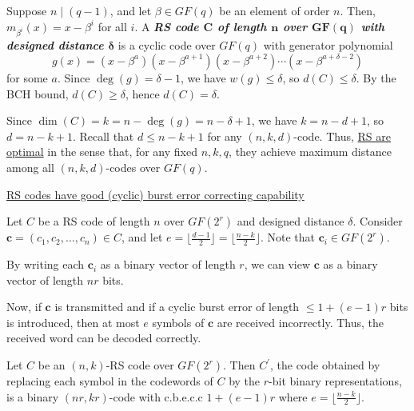 \begin{defbox}
    \begin{definition}
        Suppose $ n\mid (q-1) $, and let $ \beta\in GF(q) $ be an element of order $ n $.
        Then, $ m_{\beta^i}(x)=x-\beta^i $ for all $ i $. A
        \textbf{\emph{RS code $ \bm{C} $ of length $ \bm{n} $ over $ \bm{GF(q)} $
                with designed distance $ \bm{\delta} $}} is a cyclic code over $ GF(q) $
        with generator polynomial
        \[ g(x)=(x-\beta^{a})(x-\beta^{a+1})(x-\beta^{a+2})\cdots
            (x-\beta^{a+\delta-2}) \]
        for some $ a $. Since $ \deg(g)=\delta-1 $, we have $ w(g)\leqslant \delta $,
        so $ d(C)\leqslant \delta $. By the BCH bound, $ d(C)\geqslant \delta $,
        hence $ d(C)=\delta $.

        Since $ \dim(C)=k=n-\deg(g)=n-\delta+1 $, we have $ k=n-d+1 $,
        so $ d=n-k+1 $. Recall that $ d\leqslant n-k+1 $ for any $ (n,k,d) $-code.
        Thus, \underline{RS are optimal} in the sense that, for any fixed $ n,k,q $,
        they achieve maximum distance among all $ (n,k,d) $-codes over $ GF(q) $.
    \end{definition}
\end{defbox}

\underline{RS codes have good (cyclic) burst error correcting capability}

Let $ C $ be a RS code of length $ n $ over $ GF(2^r) $ and designed
distance $ \delta $. Consider $ \bm{c}=(c_1,c_2,\ldots ,c_n)\in C $,
and let $ e=\lfloor\frac{d-1}{2} \rfloor =\lfloor\frac{n-k}{2} \rfloor $.
Note that $ \bm{c}_i\in GF(2^r) $.

By writing each $ \bm{c}_i $ as a binary vector of length
$ r $, we can view $ \bm{c} $ as a binary vector of length $ nr $ bits.

Now, if $ \bm{c} $ is transmitted and if a cyclic burst error of length
$ \leqslant 1+(e-1)r $ bits is introduced, then at most $ e $
symbols of $ \bm{c} $ are received incorrectly. Thus, the received
word can be decoded correctly.

\begin{thmbox}
    \begin{theorem}
        Let $ C $ be an $ (n,k) $-RS code over $ GF(2^r) $. Then
        $ C^{\prime} $, the code obtained by replacing each symbol
        in the codewords of $ C $ by the $ r $-bit binary representations,
        is a binary $ (nr,kr) $-code with c.b.e.c.c $ 1+(e-1)r $
        where $ e=\lfloor \frac{n-k}{2} \rfloor $.
    \end{theorem}
\end{thmbox}

